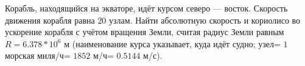 Корабль, находящийся на экваторе, идёт курсом северо --- восток. Скорость
движения корабля равна $20$ узлам. Найти абсолютную скорость и кориолисо
во ускорение корабля с учётом вращения Земли, считая радиус Земли равным
$R=6.378*10^6$ м (наименование курса указывает, куда идёт судно; узел=
$1$ морская миля/ч= $1852$ м/ч= $0.5144$ м/с).
